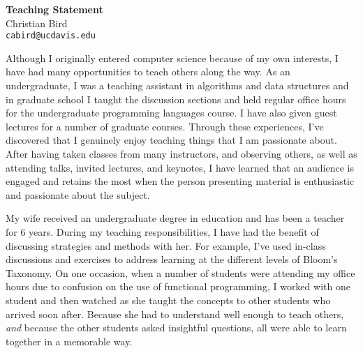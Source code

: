 \documentclass[10pt]{article}
\begin{document}
\pagestyle{empty}

\begin{center}
{\LARGE \bf Teaching Statement}\\
\vspace*{0.2cm}
{\large Christian Bird}\\
\vspace*{0.1cm}
\texttt{\normalsize cabird@ucdavis.edu}\\
\end{center}




Although I originally entered computer science because of my own interests,
I have had many opportunities to
teach others along the way.  As an undergraduate, I was a teaching assistant in
algorithms and data structures and in graduate school I taught the discussion
sections and held regular office hours for the undergraduate programming
languages course.  I have also given guest lectures for a number of graduate
courses.  Through these experiences, I've discovered that I genuinely enjoy teaching
things that I am passionate about.  After having taken classes from many
instructors, and observing others, as well as attending talks, invited
lectures, and keynotes, I have learned that an audience is engaged and retains
the most when the person presenting material is enthusiastic and passionate
about the subject.

My wife received an undergraduate degree in education and has been a teacher
for 6 years.  During my teaching responsibilities, I have had the benefit of
discussing strategies and methods with her.  For example, I've used in-class
discussions and exercises to address learning at the different levels of Bloom's
Taxonomy.  On one occasion, when a number of students were attending my office
hours due to confusion on the use of functional programming, I worked with one
student and then watched as she taught the concepts to other students who arrived
soon after.  Because she had to understand well enough to teach others,
\emph{and} because the other students asked insightful questions, all were able
to learn together in a memorable way.
\end{document}
